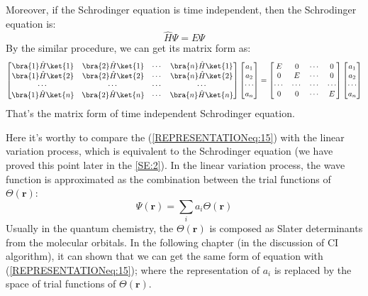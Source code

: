 Moreover, if the Schrodinger equation is time independent, then the
Schrodinger equation is:
\begin{equation}\label{}
\hat{H}\Psi = E\Psi
\end{equation}
By the similar procedure, we can get its matrix form as:
\begin{equation}\label{REPRESENTATIONeq:15}
\begin{bmatrix}
     \bra{1}\hat{H}\ket{1} & \bra{2}\hat{H}\ket{1} & \cdots & \bra{n}\hat{H}\ket{1} \\
     \bra{1}\hat{H}\ket{2} & \bra{2}\hat{H}\ket{2} & \cdots & \bra{n}\hat{H}\ket{2} \\
     \cdots                & \cdots                & \cdots &                \cdots \\
     \bra{1}\hat{H}\ket{n} & \bra{2}\hat{H}\ket{n} & \cdots & \bra{n}\hat{H}\ket{n} \\
   \end{bmatrix}
   \begin{bmatrix}
  a_{1} \\
  a_{2} \\
  \cdots \\
  a_{n} \\
\end{bmatrix}
=
\begin{bmatrix}
     E & 0 & \cdots & 0 \\
     0 & E & \cdots & 0 \\
     \cdots & \cdots & \cdots & \cdots \\
     0 & 0 & \cdots & E \\
   \end{bmatrix}
   \begin{bmatrix}
  a_{1} \\
  a_{2} \\
  \cdots \\
  a_{n} \\
\end{bmatrix}
\end{equation}
That's the matrix form of time independent Schrodinger equation.

Here it's worthy to compare the (\ref{REPRESENTATIONeq:15}) with the
linear variation process, which is equivalent to the Schrodinger
equation (we have proved this point later in the \ref{SE:2}). In the
linear variation process, the wave function is approximated as the
combination between the trial functions of $\Theta(\bm{r})$:
\begin{equation}\label{}
\Psi(\bm{r}) = \sum_{i}a_{i}\Theta(\bm{r})
\end{equation}
Usually in the quantum chemistry, the $\Theta(\bm{r})$ is composed
as Slater determinants from the molecular orbitals. In the following
chapter (in the discussion of CI algorithm), it can shown that we
can get the same form of equation with (\ref{REPRESENTATIONeq:15});
where the representation of $a_{i}$ is replaced by the space of
trial functions of $\Theta(\bm{r})$.

